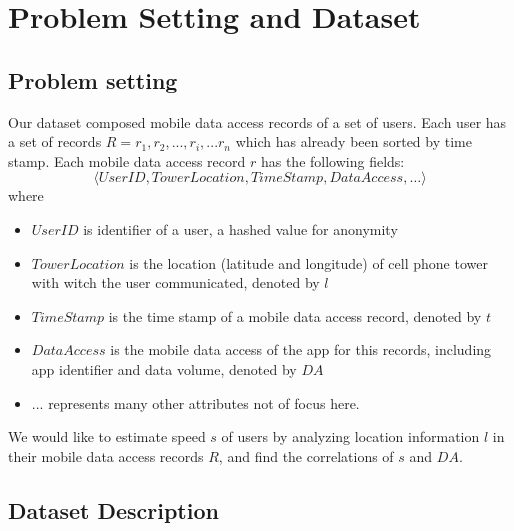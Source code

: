 \section{Problem Setting and Dataset}

\subsection{Problem setting}

Our dataset composed mobile data access records of a set of users. Each user has a set of records $R = {r_1, r_2, ...,r_i, ... r_n}$ which has already been sorted by time stamp.
Each mobile data access record $r$ has the following fields:
\begin{equation*}
  \langle UserID, TowerLocation, TimeStamp, DataAccess, \dots \rangle
\end{equation*}
where
\begin{itemize}
  \item $UserID$ is identifier of a user, a hashed value for anonymity
  \item $TowerLocation$ is the location (latitude and longitude) of cell phone tower with witch the user communicated, denoted by $l$
  \item $TimeStamp$ is the time stamp of a mobile data access record, denoted by $t$
  \item $DataAccess$ is the mobile data access of the app for this records, including app identifier and data volume, denoted by $DA$
  \item ... represents many other attributes not of focus here.
\end{itemize}
We would like to estimate speed $s$ of users by analyzing location information $l$ in their mobile data access records $R$, and find the correlations of $s$ and $DA$. 

\subsection{Dataset Description}

